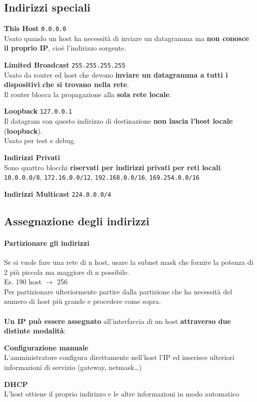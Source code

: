 \documentclass[10pt]{article}
\begin{document}
\subsection{Indirizzi speciali}
\begin{list}{}{}
\item \textbf{This Host} \texttt{0.0.0.0}\\Usato quando un host ha necessità di inviare un datagramma ma \textbf{non conosce il proprio IP}, cioè l'indirizzo sorgente.
\item \textbf{Limited Broadcast} \texttt{255.255.255.255}\\Usato da router ed host che devono \textbf{inviare un datagramma a tutti i dispositivi che si trovano nella rete}.\\
Il router blocca la propagazione alla \textbf{sola rete locale}.
\item \textbf{Loopback} \texttt{127.0.0.1}\\Il datagram con questo indirizzo di destinazione \textbf{non lascia l'host locale} (\textbf{loopback}).\\
Usato per test e debug.
\item \textbf{Indirizzi Privati}\\Sono quattro blocchi \textbf{riservati per indirizzi privati per reti locali}.\\
\texttt{10.0.0.0/8}, \texttt{172.16.0.0/12}, \texttt{192.168.0.0/16}, \texttt{169.254.0.0/16}
\item \textbf{Indirizzi Multicast} \texttt{224.0.0.0/4}
\end{list}
\subsection{Assegnazione degli indirizzi}
\paragraph{Partizionare gli indirizzi} Se si vuole fare una rete di n host, usare la subnet mask che fornire la potenza di 2 più piccola ma maggiore di n possibile.\\
Es. 190 host $\rightarrow$ 256\\
Per partizionare ulteriormente partire dalla partizione che ha necessità del numero di host più grande e procedere come sopra.
\paragraph{} \textbf{Un IP può essere assegnato} all'interfaccia di un host \textbf{attraverso due distinte modalità}:
\begin{list}{}{}
\item \textbf{Configurazione manuale}\\
L'amministratore configura direttamente nell'host l'IP ed inserisce ulteriori informazioni di servizio (gateway, netmask\ldots)
\item \textbf{DHCP}\\
L'host ottiene il proprio indirizzo e le altre informazioni in modo automatico
\end{list}
\pagebreak
\end{document}

